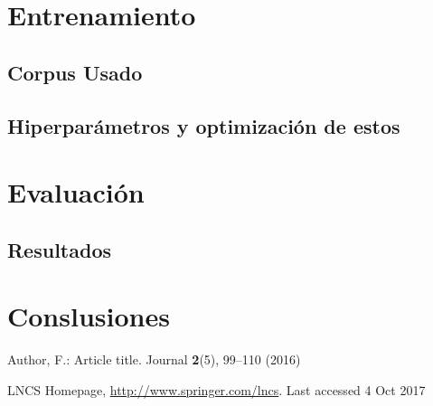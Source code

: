 \documentclass[runningheads]{llncs}
\begin{document}
\section{Entrenamiento}

\subsection{Corpus Usado}

\subsection{Hiperparámetros y optimización de estos}

\section{Evaluación}

\subsection{Resultados}

\section{Conslusiones}


\begin{thebibliography}{8}
Author, F.: Article title. Journal \textbf{2}(5), 99--110 (2016)





LNCS Homepage, \url{http://www.springer.com/lncs}. Last accessed 4
Oct 2017
\end{thebibliography}
\end{document}
